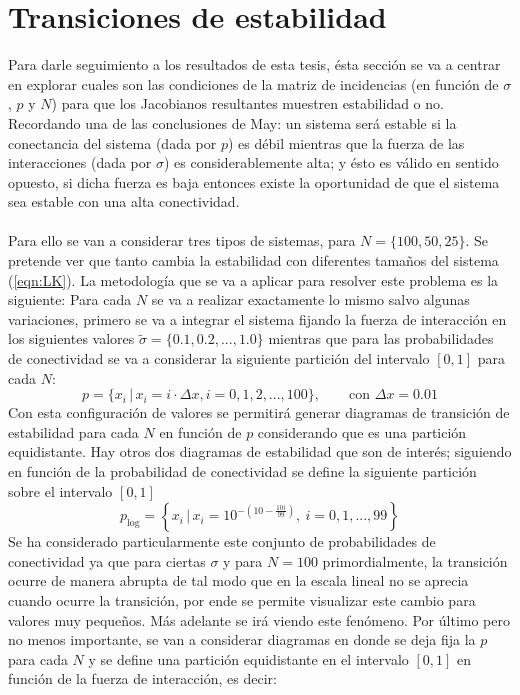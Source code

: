 \section{Transiciones de estabilidad}

Para darle seguimiento a los resultados de esta tesis, ésta sección se va a centrar en explorar cuales son las condiciones de la matriz de incidencias (en función de $\sigma$, $p$ y $N$) para que los Jacobianos resultantes muestren estabilidad o no. Recordando una de las conclusiones de May: un sistema será estable si la conectancia del sistema (dada por $p$) es débil mientras que la fuerza de las interacciones (dada por $\sigma$) es considerablemente alta; y ésto es válido en sentido opuesto, si dicha fuerza es baja entonces existe la oportunidad de que el sistema sea estable con una alta conectividad. \\
\\
Para ello se van a considerar tres tipos de sistemas, para $N=\{100,50,25\}$. Se pretende ver que tanto cambia la estabilidad con diferentes tamaños del sistema (\ref{eqn:LK}). La metodología que se va a aplicar para resolver este problema es la siguiente: Para cada $N$ se va a realizar exactamente lo mismo salvo algunas variaciones, primero se va a integrar el sistema fijando la fuerza de interacción en los siguientes valores $\tilde{\sigma}=\{0.1,0.2,...,1.0\}$ mientras que para las probabilidades de conectividad se va a considerar la siguiente partición del intervalo $[0,1]$ para cada $N$:
\begin{equation}\label{eqn:particionLin}
	p = \{x_i\, |\, x_i=i\cdot\Delta x, i=0,1,2,...,100\},\qquad\text{con }\Delta x=0.01
\end{equation}
Con esta configuración de valores se permitirá generar diagramas de transición de estabilidad para cada $N$ en función de $p$ considerando que es una partición equidistante. Hay otros dos diagramas de estabilidad que son de interés; siguiendo en función de la probabilidad de conectividad se define la siguiente partición sobre el intervalo $[0,1]$
\begin{equation}\label{eqn:particionLog}
	p_{\log}=\left \{ x_i\, |\, x_i=10^{-\left (10-\frac{10i}{99}\right )},\ i=0,1,...,99\right \}
\end{equation}
Se ha considerado particularmente este conjunto de probabilidades de conectividad ya que para ciertas $\sigma$ y para $N=100$ primordialmente, la transición ocurre de manera abrupta de tal modo que en la escala lineal no se aprecia cuando ocurre la transición, por ende se permite visualizar este cambio para valores muy pequeños. Más adelante se irá viendo este fenómeno. Por último pero no menos importante, se van a considerar diagramas en donde se deja fija la $p$ para cada $N$ y se define una partición equidistante en el intervalo $[0,1]$ en función de la fuerza de interacción, es decir:
